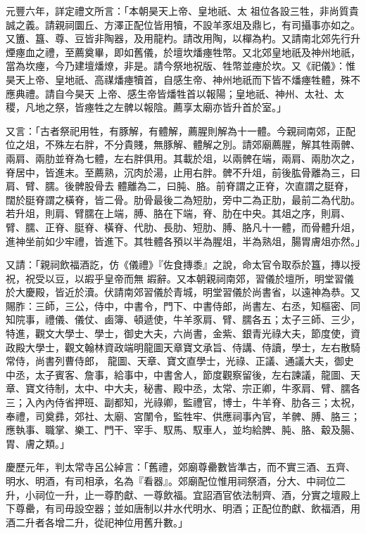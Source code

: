 \begin{pinyinscope}
 元豐六年，詳定禮文所言：「本朝昊天上帝、皇地祇、太
 祖位各設三牲，非尚質貴誠之義。請親祠圜丘、方澤正配位皆用犢，不設羊豕俎及鼎匕，有司攝事亦如之。又簠、簋、尊、豆皆非陶器，及用龍杓。請改用陶，以樿為杓。又請南北郊先行升煙瘞血之禮，至薦奠畢，即如舊儀，於壇坎燔瘞牲幣。又北郊皇地祇及神州地祇，當為坎瘞，今乃建壇燔燎，非是。請今祭地祝版、牲幣並瘞於坎。又《祀儀》：惟昊天上帝、皇地祇、高禖燔瘞犢首，自感生帝、神州地祇而下皆不燔瘞牲體，殊不應典禮。請自今昊天
 上帝、感生帝皆燔牲首以報陽；皇地祇、神州、太社、太稷，凡地之祭，皆瘞牲之左髀以報陰。薦享太廟亦皆升首於室。」



 又言：「古者祭祀用牲，有豚解，有體解，薦腥則解為十一體。今親祠南郊，正配位之俎，不殊左右胖，不分貴賤，無豚解、體解之別。請郊廟薦腥，解其牲兩髀、兩肩、兩肋並脊為七體，左右胖俱用。其載於俎，以兩髀在端，兩肩、兩肋次之，脊居中，皆進末。至薦熟，沉肉於湯，止用右胖。髀不升俎，前後肱骨離為三，曰肩、臂、臑。後髀股骨去
 體離為二，曰肫、胳。前脊謂之正脊，次直謂之脡脊，闊於脡脊謂之橫脊，皆二骨。肋骨最後二為短肋，旁中二為正肋，最前二為代肋。若升俎，則肩、臂臑在上端，膊、胳在下端，脊、肋在中央。其俎之序，則肩、臂、臑、正脊、脡脊、橫脊、代肋、長肋、短肋、膊、胳凡十一體，而骨體升俎，進神坐前如少牢禮，皆進下。其牲體各預以半為腥俎，半為熟俎，腸胃膚俎亦然。」



 又請：「親祠飲福酒訖，仿《儀禮》『佐食摶黍』之說，命太官令取忝於簋，摶以授祝，祝受以豆，以嘏乎皇帝而無
 嘏辭。又本朝親祠南郊，習儀於壇所，明堂習儀於大慶殿，皆近於瀆。伏請南郊習儀於青城，明堂習儀於尚書省，以遠神為恭。又賜胙：三師，三公，侍中，中書令，門下、中書侍郎，尚書左、右丞，知樞密、同知院事，禮儀、儀仗、鹵簿、頓遞使，牛羊豕肩、臂、臑各五；太子三師、三少，特進，觀文大學士、學士，御史大夫，六尚書，金紫、銀青光祿大夫，節度使，資政殿大學士，觀文翰林資政端明龍圖天章寶文承旨、侍講、侍讀，學士，左右散騎常侍，尚書列曹侍郎，
 龍圖、天章、寶文直學士，光祿、正議、通議大夫，御史中丞，太子賓客、詹事，給事中，中書舍人，節度觀察留後，左右諫議，龍圖、天章、寶文待制，太中、中大夫，秘書、殿中丞，太常、宗正卿，牛豕肩、臂、臑各三；入內內侍省押班、副都知，光祿卿，監禮官，博士，牛羊脊、肋各三；太祝，奉禮，司奠彞，郊社、太廟、宮闈令，監牲牢、供應祠事內官，羊髀、膊、胳三；應執事、職掌、樂工、門干、宰手、馭馬、馭車人，並均給脾、肫、胳、觳及腸、胃、膚之類。」



 慶歷元年，判太常寺呂公綽言：「舊禮，郊廟尊罍數皆準古，而不實三酒、五齊、明水、明酒，有司相承，名為『看器』。郊廟配位惟用祠祭酒，分大、中祠位二升，小祠位一升，止一尊酌獻、一尊飲福。宜詔酒官依法制齊、酒，分實之壇殿上下尊罍，有司毋設空器；並如唐制以井水代明水、明酒；正配位酌獻、飲福酒，用酒二升者各增二升，從祀神位用舊升數。」



\end{pinyinscope}